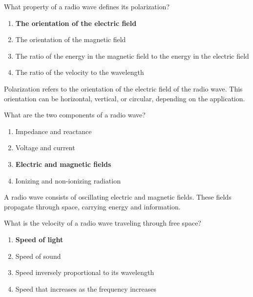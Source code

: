 \begin{tcolorbox}[colback=gray!10!white,colframe=black!75!black,title={T3B02}]
What property of a radio wave defines its polarization?
\begin{enumerate}[label=\Alph*),noitemsep]
    \item \textbf{The orientation of the electric field}
    \item The orientation of the magnetic field
    \item The ratio of the energy in the magnetic field to the energy in the electric field
    \item The ratio of the velocity to the wavelength
\end{enumerate}
\end{tcolorbox}

Polarization refers to the orientation of the electric field of the radio wave. This orientation can be horizontal, vertical, or circular, depending on the application.

\begin{tcolorbox}[colback=gray!10!white,colframe=black!75!black,title={T3B03}]
What are the two components of a radio wave?
\begin{enumerate}[label=\Alph*),noitemsep]
    \item Impedance and reactance
    \item Voltage and current
    \item \textbf{Electric and magnetic fields}
    \item Ionizing and non-ionizing radiation
\end{enumerate}
\end{tcolorbox}

A radio wave consists of oscillating electric and magnetic fields. These fields propagate through space, carrying energy and information.

\begin{tcolorbox}[colback=gray!10!white,colframe=black!75!black,title={T3B04}]
What is the velocity of a radio wave traveling through free space?
\begin{enumerate}[label=\Alph*),noitemsep]
    \item \textbf{Speed of light}
    \item Speed of sound
    \item Speed inversely proportional to its wavelength
    \item Speed that increases as the frequency increases
\end{enumerate}
\end{tcolorbox}

